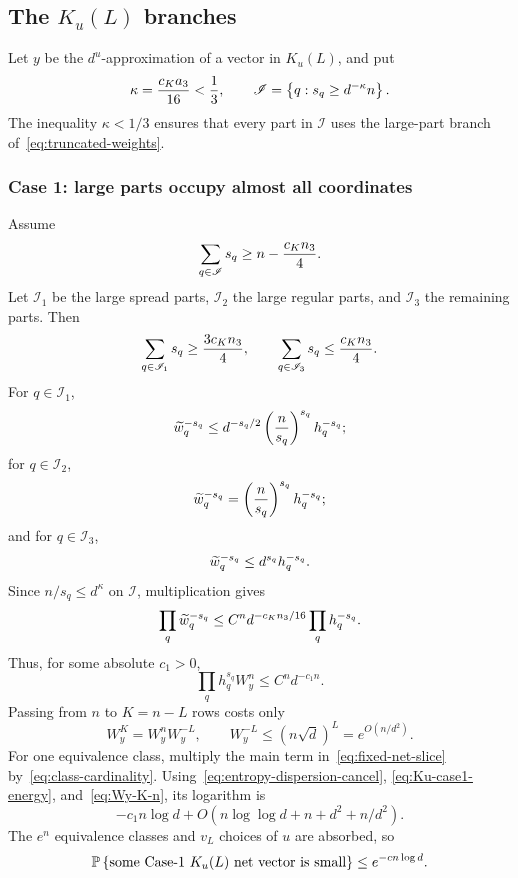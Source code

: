 \subsection{\texorpdfstring{The $K_u(L)$ branches}{The Ku(L) branches}}

Let $y$ be the $d^u$-approximation of a vector in $K_u(L)$, and put
\begin{equation}\label{eq:kappa-I-large}
  \kappa=\frac{c_K a_3}{16}<\frac13,
  \qquad
  \mathscr I=\left\{q:s_q\ge d^{-\kappa}n\right\}.
\end{equation}
The inequality $\kappa<1/3$ ensures that every part in $\mathscr I$ uses the large-part branch of~\eqref{eq:truncated-weights}.

\subsubsection{Case 1: large parts occupy almost all coordinates}

Assume
\[
  \sum_{q\in\mathscr I}s_q\ge n-\frac{c_K n_3}{4}.
\]
Let $\mathscr I_1$ be the large spread parts, $\mathscr I_2$ the large regular parts, and $\mathscr I_3$ the remaining parts. Then
\[
  \sum_{q\in\mathscr I_1}s_q\ge\frac{3c_K n_3}{4},
  \qquad
  \sum_{q\in\mathscr I_3}s_q\le\frac{c_K n_3}{4}.
\]
For $q\in\mathscr I_1$,
\[
  \widetilde w_q^{-s_q}
  \le d^{-s_q/2}\left(\frac n{s_q}\right)^{s_q}h_q^{-s_q};
\]
for $q\in\mathscr I_2$,
\[
  \widetilde w_q^{-s_q}
  =\left(\frac n{s_q}\right)^{s_q}h_q^{-s_q};
\]
and for $q\in\mathscr I_3$,
\[
  \widetilde w_q^{-s_q}\le d^{s_q}h_q^{-s_q}.
\]
Since $n/s_q\le d^\kappa$ on $\mathscr I$, multiplication gives
\[
  \prod_q\widetilde w_q^{-s_q}
  \le C^nd^{-c_K n_3/16}\prod_qh_q^{-s_q}.
\]
Thus, for some absolute $c_1>0$,
\begin{equation}\label{eq:Ku-case1-energy}
  \prod_qh_q^{s_q}W_y^n\le C^nd^{-c_1n}.
\end{equation}
Passing from $n$ to $K=n-L$ rows costs only
\begin{equation}\label{eq:Wy-K-n}
  W_y^K=W_y^nW_y^{-L},
  \qquad
  W_y^{-L}\le(n\sqrt d)^L=e^{O(n/d^2)}.
\end{equation}
For one equivalence class, multiply the main term in~\eqref{eq:fixed-net-slice} by~\eqref{eq:class-cardinality}. Using~\eqref{eq:entropy-dispersion-cancel}, \eqref{eq:Ku-case1-energy}, and~\eqref{eq:Wy-K-n}, its logarithm is
\[
  -c_1n\log d+O(n\log\log d+n+d^2+n/d^2).
\]
The $e^n$ equivalence classes and $v_L$ choices of $u$ are absorbed, so
\begin{equation}\label{eq:Ku-case1-prob}
  \mathbb P\left\{\text{some Case-1 $K_u(L)$ net vector is small}\right\}
  \le e^{-cn\log d}.
\end{equation}

